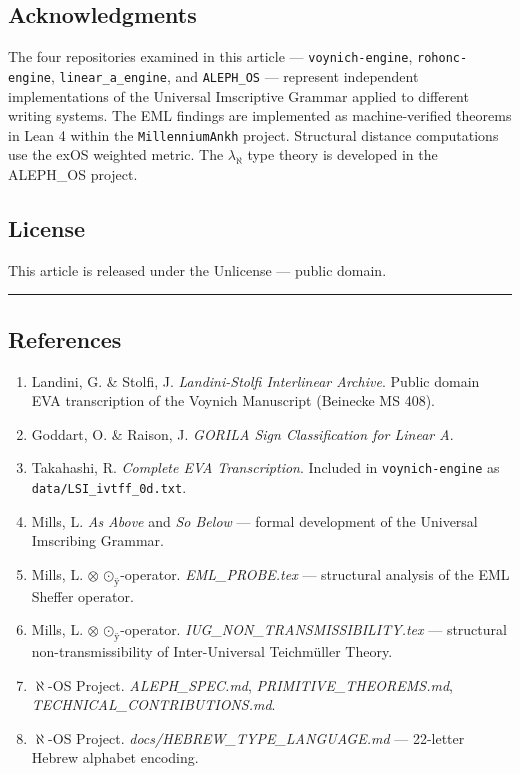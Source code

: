 \documentclass[12pt,a4paper]{article}
\begin{document}
\subsection{Acknowledgments}

The four repositories examined in this article --- \texttt{voynich-engine}, \texttt{rohonc-engine}, \texttt{linear\_a\_engine}, and \texttt{ALEPH\_OS} --- represent independent implementations of the Universal Imscriptive Grammar applied to different writing systems. The EML findings are implemented as machine-verified theorems in Lean 4 within the \texttt{MillenniumAnkh} project. Structural distance computations use the exOS weighted metric. The $\lambda_{\aleph}$ type theory is developed in the ALEPH\_OS project.

\subsection{License}

This article is released under the Unlicense --- public domain.

\begin{center}
\rule{0.5\textwidth}{0.4pt}
\end{center}

\subsection{References}

\begin{enumerate}
    \item Landini, G. \& Stolfi, J. \emph{Landini-Stolfi Interlinear Archive}. Public domain EVA transcription of the Voynich Manuscript (Beinecke MS 408).
    \item Goddart, O. \& Raison, J. \emph{GORILA Sign Classification for Linear A}.
    \item Takahashi, R. \emph{Complete EVA Transcription}. Included in \texttt{voynich-engine} as \texttt{data/LSI\_ivtff\_0d.txt}.
    \item Mills, L. \emph{As Above} and \emph{So Below} --- formal development of the Universal Imscribing Grammar.
    \item Mills, L. $\otimes$ $\text{⊙}_{\text{ÿ}}$-operator. \emph{EML\_PROBE.tex} --- structural analysis of the EML Sheffer operator.
    \item Mills, L. $\otimes$ $\text{⊙}_{\text{ÿ}}$-operator. \emph{IUG\_NON\_TRANSMISSIBILITY.tex} --- structural non-transmissibility of Inter-Universal Teichmüller Theory.
    \item $\aleph$-OS Project. \emph{ALEPH\_SPEC.md}, \emph{PRIMITIVE\_THEOREMS.md}, \emph{TECHNICAL\_CONTRIBUTIONS.md}.
    \item $\aleph$-OS Project. \emph{docs/HEBREW\_TYPE\_LANGUAGE.md} --- 22-letter Hebrew alphabet encoding.
\end{enumerate}
\end{document}
